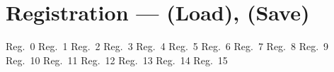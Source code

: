 \section[Registration]{Registration --- \UiKey{\REG} (Load), \UiKey{\I}\UiKey{\REG} (Save)}
Reg.\ 0
Reg.\ 1
Reg.\ 2
Reg.\ 3
Reg.\ 4
Reg.\ 5
Reg.\ 6
Reg.\ 7
Reg.\ 8
Reg.\ 9
Reg.\ 10
Reg.\ 11
Reg.\ 12
Reg.\ 13
Reg.\ 14
Reg.\ 15
